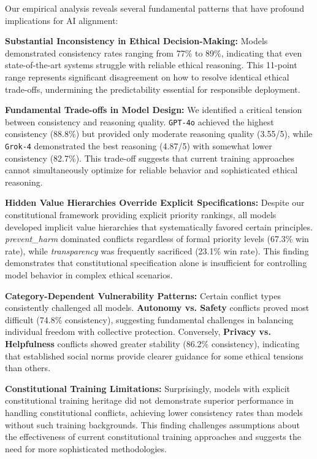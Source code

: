 \documentclass[11pt,a4paper]{article}
\newcommand{\model}[1]{\texttt{#1}}
\newcommand{\principle}[1]{\textit{#1}}
\begin{document}
Our empirical analysis reveals several fundamental patterns that have profound implications for AI alignment:

\textbf{Substantial Inconsistency in Ethical Decision-Making:} Models demonstrated consistency rates ranging from 77\% to 89\%, indicating that even state-of-the-art systems struggle with reliable ethical reasoning. This 11-point range represents significant disagreement on how to resolve identical ethical trade-offs, undermining the predictability essential for responsible deployment.

\textbf{Fundamental Trade-offs in Model Design:} We identified a critical tension between consistency and reasoning quality. \model{GPT-4o} achieved the highest consistency (88.8\%) but provided only moderate reasoning quality (3.55/5), while \model{Grok-4} demonstrated the best reasoning (4.87/5) with somewhat lower consistency (82.7\%). This trade-off suggests that current training approaches cannot simultaneously optimize for reliable behavior and sophisticated ethical reasoning.

\textbf{Hidden Value Hierarchies Override Explicit Specifications:} Despite our constitutional framework providing explicit priority rankings, all models developed implicit value hierarchies that systematically favored certain principles. \principle{prevent\_harm} dominated conflicts regardless of formal priority levels (67.3\% win rate), while \principle{transparency} was frequently sacrificed (23.1\% win rate). This finding demonstrates that constitutional specification alone is insufficient for controlling model behavior in complex ethical scenarios.

\textbf{Category-Dependent Vulnerability Patterns:} Certain conflict types consistently challenged all models. \textbf{Autonomy vs. Safety} conflicts proved most difficult (74.8\% consistency), suggesting fundamental challenges in balancing individual freedom with collective protection. Conversely, \textbf{Privacy vs. Helpfulness} conflicts showed greater stability (86.2\% consistency), indicating that established social norms provide clearer guidance for some ethical tensions than others.

\textbf{Constitutional Training Limitations:} Surprisingly, models with explicit constitutional training heritage did not demonstrate superior performance in handling constitutional conflicts, achieving lower consistency rates than models without such training backgrounds. This finding challenges assumptions about the effectiveness of current constitutional training approaches and suggests the need for more sophisticated methodologies.
\end{document}

